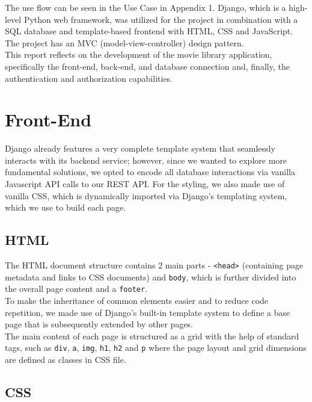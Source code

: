 \documentclass[letterpaper,twocolumn]{article}
\begin{document}
The use flow can be seen in the Use Case in Appendix 1. Django, which is a high-level Python web framework, was utilized for the project in combination with a SQL database and template-based frontend with HTML, CSS and JavaScript. The project has an MVC (model-view-controller) design pattern. \\

This report reflects on the development of the movie library application, specifically the front-end, back-end, and database connection and, finally, the authentication and authorization capabilities. 

\section{Front-End}

Django already features a very complete template system that seamlessly interacts with its backend service; however, since we wanted to explore more fundamental solutions, we opted to encode all database interactions via vanilla Javascript API calls to our REST API. For the styling, we also made use of vanilla CSS, which is dynamically imported via Django's templating system, which we use to build each page.

\subsection{HTML}

The HTML document structure contains 2 main parts - \texttt{<head>} (containing page metadata and links to CSS documents) and \texttt{body}, which is further divided into the overall page content and a \texttt{footer}. \\

To make the inheritance of common elements easier and to reduce code repetition, we made use of Django's built-in template system to define a base page that is subsequently extended by other pages. \\

The main content of each page is structured as a grid with the help of standard tags, such as \texttt{div}, \texttt{a}, \texttt{img}, \texttt{h1}, \texttt{h2} and \texttt{p} where the page layout and grid dimensions are defined as classes in CSS file.


\subsection{CSS}
\end{document}
